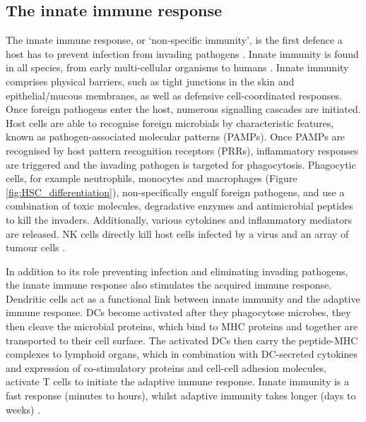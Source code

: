 \subsection{The innate immune response}
The innate immune response, or `non-specific immunity', is the first defence a host has to prevent infection from invading pathogens \cite{alberts2007molecularimmune}.
Innate immunity is found in all species, from early multi-cellular organisms to humans \cite{hoffmann2013innate}.
Innate immunity comprises physical barriers, such as tight junctions in the skin and epithelial/mucous membranes, as well as defensive cell-coordinated responses.
Once foreign pathogens enter the host, numerous signalling cascades are initiated.
Host cells are able to recognise foreign microbials by characteristic features, known as pathogen-associated molecular patterns (PAMPs).
Once PAMPs are recognised by host pattern recognition receptors (PRRs), inflammatory responses are triggered and the invading pathogen is targeted for phagocytosis.
Phagocytic cells, for example neutrophils, monocytes and macrophages (Figure \ref{fig:HSC_differentiation}), non-specifically engulf foreign pathogens, and use a combination of toxic molecules, degradative enzymes and antimicrobial peptides to kill the invaders.
Additionally, various cytokines and inflammatory mediators are released.
NK cells directly kill host cells infected by a virus \cite{alberts2007molecularimmune} and an array of tumour cells \cite{hoffmann2013innate}.

In addition to its role preventing infection and eliminating invading pathogens, the innate immune response also stimulates the acquired immune response.
Dendritic cells act as a functional link between innate immunity and the adaptive immune response.
DCs become activated after they phagocytose microbes, they then cleave the microbial proteins, which bind to MHC proteins and together are transported to their cell surface.
The activated DCs then carry the peptide-MHC complexes to lymphoid organs, which in combination with DC-secreted cytokines and expression of co-stimulatory proteins and cell-cell adhesion molecules, activate T cells to initiate the adaptive immune response.
Innate immunity is a fast response (minutes to hours), whilst adaptive immunity takes longer (days to weeks) \cite{alberts2007molecularimmune}.

